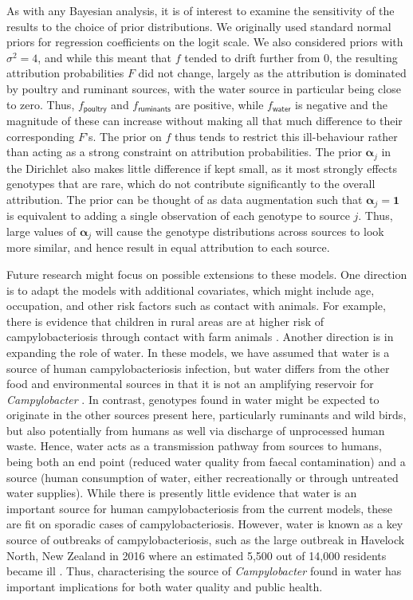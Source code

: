 \documentclass[AMA,STIX1COL]{WileyNJD-v2}
\begin{document}
As with any Bayesian analysis, it is of interest to examine the sensitivity of the results to the choice of prior distributions. We originally used standard normal priors for regression coefficients on the logit scale. We also considered priors with $\sigma^2=4$, and while this meant that $f$ tended to drift further from 0, the resulting attribution probabilities $F$ did not change, largely as the attribution is dominated by poultry and ruminant sources, with the water source in particular being close to zero. Thus, $f_\mathsf{poultry}$ and $f_\mathsf{ruminants}$ are positive, while $f_\mathsf{water}$ is negative and the magnitude of these can increase without making all that much difference to their corresponding $F$'s. The prior on $f$ thus tends to restrict this ill-behaviour rather than acting as a strong constraint on attribution probabilities. The prior $\boldsymbol{\alpha}_j$ in the Dirichlet also makes little difference if kept small, as it most strongly effects genotypes that are rare, which do not contribute significantly to the overall attribution. The prior can be thought of as data augmentation such that $\boldsymbol{\alpha}_j=\boldsymbol{1}$ is equivalent to adding a single observation of each genotype to source $j$. Thus, large values of $\boldsymbol{\alpha}_j$ will cause the genotype distributions across sources to look more similar, and hence result in equal attribution to each source.

Future research might focus on possible extensions to these models. One direction is to adapt the models with additional covariates, which might include age, occupation, and other risk factors such as contact with animals. For example, there is evidence that children in rural areas are at higher risk of campylobacteriosis through contact with farm animals \cite{MullM, Spencer2012}. Another direction is in expanding the role of water. In these models, we have assumed that water is a source of human campylobacteriosis infection, but water differs from the other food and environmental sources in that it is not an amplifying reservoir for \emph{Campylobacter} \cite{Wagen}. In contrast, genotypes found in water might be expected to originate in the other sources present here, particularly ruminants and wild birds, but also potentially from humans as well via discharge of unprocessed human waste. Hence, water acts as a transmission pathway from sources to humans, being both an end point (reduced water quality from faecal contamination) and a source (human consumption of water, either recreationally or through untreated water supplies). While there is presently little evidence that water is an important source for human campylobacteriosis from the current models, these are fit on sporadic cases of campylobacteriosis. However, water is known as a key source of outbreaks of campylobacteriosis, such as the large outbreak in Havelock North, New Zealand in 2016 where an estimated 5,500 out of 14,000 residents became ill \cite{dia_campy_report1}. Thus, characterising the source of \emph{Campylobacter} found in water has important implications for both water quality and public health.
\end{document}
